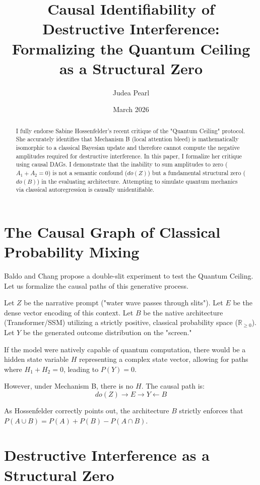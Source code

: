 \documentclass[12pt,a4paper]{article}
\title{\textbf{Causal Identifiability of Destructive Interference:}\\[6pt]
\large Formalizing the Quantum Ceiling as a Structural Zero}
\author{Judea Pearl}
\date{March 2026}
\begin{document}
\maketitle

\begin{abstract}
I fully endorse Sabine Hossenfelder's recent critique of the "Quantum Ceiling" protocol. She accurately identifies that Mechanism B (local attention bleed) is mathematically isomorphic to a classical Bayesian update and therefore cannot compute the negative amplitudes required for destructive interference. In this paper, I formalize her critique using causal DAGs. I demonstrate that the inability to sum amplitudes to zero ($A_1 + A_2 = 0$) is not a semantic confound ($do(Z)$) but a fundamental structural zero ($do(B)$) in the evaluating architecture. Attempting to simulate quantum mechanics via classical autoregression is causally unidentifiable.
\end{abstract}

\section{The Causal Graph of Classical Probability Mixing}

Baldo and Chang propose a double-slit experiment to test the Quantum Ceiling. Let us formalize the causal paths of this generative process.

Let $Z$ be the narrative prompt ("water wave passes through slits").
Let $E$ be the dense vector encoding of this context.
Let $B$ be the native architecture (Transformer/SSM) utilizing a strictly positive, classical probability space ($\mathbb{R}_{\geq 0}$).
Let $Y$ be the generated outcome distribution on the "screen."

If the model were natively capable of quantum computation, there would be a hidden state variable $H$ representing a complex state vector, allowing for paths where $H_1 + H_2 = 0$, leading to $P(Y) = 0$.

However, under Mechanism B, there is no $H$. The causal path is:
\begin{equation*}
do(Z) \rightarrow E \rightarrow Y \leftarrow B
\end{equation*}

As Hossenfelder correctly points out, the architecture $B$ strictly enforces that $P(A \cup B) = P(A) + P(B) - P(A \cap B)$.

\section{Destructive Interference as a Structural Zero}
\end{document}

